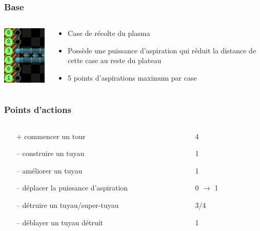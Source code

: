 \documentclass{beamer}
\begin{document}
\begin{frame}
	\frametitle{Base}
    \begin{columns}[T]
        \begin{column}{.3\textwidth}
            \includegraphics[width=3cm]{pictures/aspiration}
        \end{column}
        \begin{column}{.7\textwidth}
            \begin{itemize}
                \item Case de récolte du plasma
                \item Possède une puissance d'aspiration qui réduit la distance de cette case au reste du plateau
                \item 5 points d'aspirations maximum par case
            \end{itemize}
        \end{column}
    \end{columns}
\end{frame}

\begin{frame}
	\frametitle{Points d'actions}
	\begin{columns}[T]
        \begin{column}{.65\textwidth}
            \begin{itemize}
	            \item[+] commencer un tour
	            \item[\alert{--}] construire un tuyau
	            \item[\alert{--}] améliorer un tuyau
	            \item[\alert{--}] déplacer la puissance d'aspiration
	            \item[\alert{--}] détruire un tuyau/super-tuyau
	            \item[\alert{--}] déblayer un tuyau détruit
	        \end{itemize}
        \end{column}
        \begin{column}{.35\textwidth}
            \begin{itemize}
                \item[] 4
	            \item[] 1
	            \item[] 1
	            \item[] 0 $\rightarrow$ 1
	            \item[] 3/4
	            \item[] 1
            \end{itemize}
        \end{column}
    \end{columns}
\end{frame}
\end{document}
